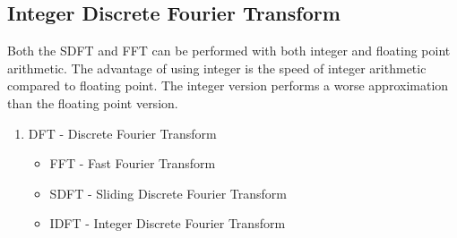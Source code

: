 \subsection{Integer Discrete Fourier Transform}
Both the SDFT and FFT can be performed with both
integer and floating point arithmetic. The advantage
of using integer is the speed of integer arithmetic compared to floating point.
The integer version performs a worse approximation than the floating point
version. 

\begin{enumerate}
\item DFT - Discrete Fourier Transform
	\begin{itemize}
	  \item FFT - Fast Fourier Transform
		\item SDFT - Sliding Discrete Fourier Transform
		\item IDFT - Integer Discrete Fourier Transform
	\end{itemize}
\end{enumerate}